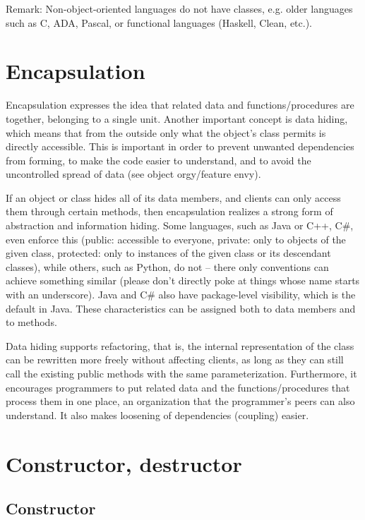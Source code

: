 \documentclass[margin=0px]{article}
\begin{document}
Remark: Non-object-oriented languages do not have classes, e.g. older languages such as C, ADA, Pascal, or
functional languages (Haskell, Clean, etc.).

\section{Encapsulation}
Encapsulation expresses the idea that related data and functions/procedures are together, belonging to a single unit. Another important concept is data hiding, which means that from the outside only what the object's class permits is directly accessible. This is important in order to prevent unwanted dependencies from forming, to make the code easier to understand, and to avoid the uncontrolled spread of data (see object orgy/feature envy).

If an object or class hides all of its data members, and clients can only access them through certain methods, then encapsulation realizes a strong form of abstraction and information hiding. Some languages, such as Java or C++, C\#, even enforce this (public: accessible to everyone, private: only to objects of the given class, protected: only to instances of the given class or its descendant classes), while others, such as Python, do not -- there only conventions can achieve something similar (please don't directly poke at things whose name starts with an underscore). Java and C\# also have package-level visibility, which is the default in Java. These characteristics can be assigned both to data members and to methods.

Data hiding supports refactoring, that is, the internal representation of the class can be rewritten more freely without affecting clients, as long as they can still call the existing public methods with the same parameterization. Furthermore, it encourages programmers to put related data and the functions/procedures that process them in one place, an organization that the programmer's peers can also understand. It also makes loosening of dependencies (coupling) easier.

\section{Constructor, destructor}

\subsection{Constructor}
\end{document}
